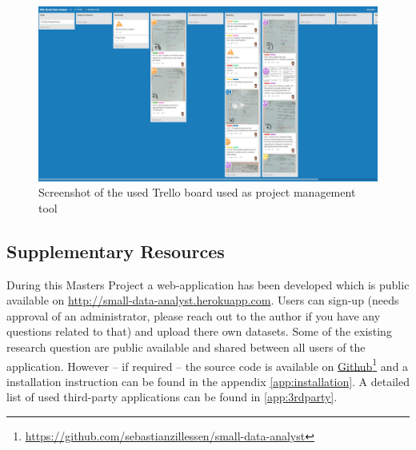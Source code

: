 \begin{figure}[h]
\centering
	\includegraphics[page=1,width=\textwidth]{figures/trello}
\caption{Screenshot of the used Trello board used as project management tool}
\label{fig:trello}
\end{figure}

\subsection{Supplementary Resources}

During this Masters Project a web-application has been developed which is public available on \href{http://small-data-analyst.herokuapp.com}{http://small-data-analyst.herokuapp.com}. Users can sign-up (needs approval of an administrator, please reach out to the author if you have any questions related to that) and upload there own datasets. Some of the existing research question are public available and shared between all users of the application. However -- if required -- the source code is available on \href{https://github.com/sebastianzillessen/small-data-analyst}{Github}\footnote{\href{https://github.com/sebastianzillessen/small-data-analyst}{https://github.com/sebastianzillessen/small-data-analyst}} and a installation instruction can be found in the appendix \autoref{app:installation}. A detailed list of used third-party applications can be found in \autoref{app:3rdparty}.

